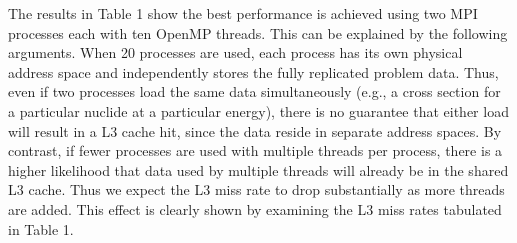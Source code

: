 \documentclass{mc2015}
\begin{document}
The results in Table 1 show the best performance is achieved using two MPI
processes each with ten OpenMP threads. This can be explained by the following
arguments. When 20 processes are used, each process has its own physical address
space and independently stores the fully replicated problem data. Thus, even if
two processes load the same data simultaneously (e.g., a cross section for a
particular nuclide at a particular energy), there is no guarantee that either
load will result in a L3 cache hit, since the data reside in separate address
spaces. By contrast, if fewer processes are used with multiple threads per
process, there is a higher likelihood that data used by multiple threads will
already be in the shared L3 cache. Thus we expect the L3 miss rate to drop
substantially as more threads are added. This effect is clearly shown by
examining the L3 miss rates tabulated in Table 1.
\end{document}
